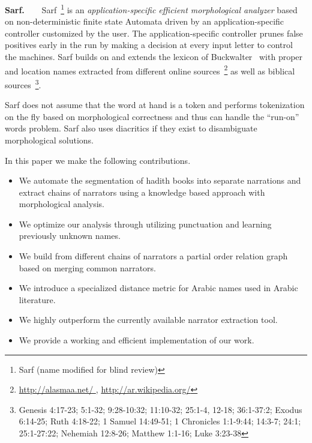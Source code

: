 \documentclass{llncs}
\begin{document}

{\bf Sarf.~~~}
Sarf~\footnote{Sarf (name modified for blind review) }
is 
an {\em application-specific efficient
morphological analyzer} based on
non-deterministic finite state Automata 
driven by an application-specific controller customized 
by the user. 
The application-specific controller prunes false positives
early in the run by making a decision at every input letter
to control the machines.
Sarf builds on and extends the lexicon of 
Buckwalter~\cite{Buckwalter:02} 
with proper and location names extracted from different online 
sources~\footnote{\href{http://alasmaa.net/}{http://alasmaa.net/ }, 
\href{http://ar.wikipedia.org/}{http://ar.wikipedia.org/}}
as well as biblical sources~\footnote{Genesis 4:17-23; 5:1-32; 9:28-10:32; 11:10-32; 25:1-4, 12-18; 36:1-37:2; Exodus 6:14-25; Ruth 4:18-22; 1 Samuel 14:49-51; 1 Chronicles 1:1-9:44; 14:3-7; 24:1; 25:1-27:22; Nehemiah 12:8-26; Matthew 1:1-16; Luke 3:23-38}.

Sarf does not assume that the word at hand is a token and
performs tokenization on the fly based on morphological correctness
and thus can handle 
the ``run-on'' words problem. 
Sarf also uses diacritics if they exist to disambiguate 
morphological solutions. 

In this paper we make the following contributions. 
\begin{itemize}
\item We automate the segmentation of hadith books into separate narrations and extract chains of narrators 
using a knowledge based approach with morphological analysis.
\item We optimize our analysis through utilizing punctuation and learning previously unknown names.
\item We build from different chains of narrators a partial order relation graph based on merging common narrators.
\item We introduce a specialized distance metric for Arabic names used in Arabic literature. 
\item We highly outperform the currently available narrator extraction tool. 
\item We provide a working and efficient implementation of our work. 
\end{itemize}
\end{document}
